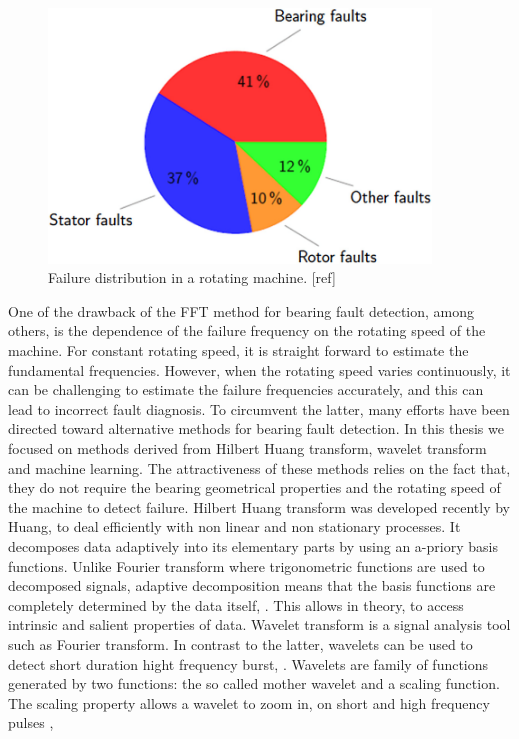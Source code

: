 \documentclass[../Main/thesis.tex]{subfiles}
\begin{document}
\begin{figure}[H] %
   \centering
   \includegraphics[width=4in]{../fig/pie.png} 
   \caption{Failure distribution in a rotating machine. [ref]}
   \label{fig:pie}
\end{figure}
\justify
One of the drawback of the FFT method for bearing fault detection, among others, is the dependence of the failure frequency on the rotating speed of the machine. For constant rotating speed, it is straight forward to estimate the fundamental frequencies. However, when the rotating speed varies continuously, it can be challenging to estimate the failure frequencies accurately, and this can lead to incorrect fault diagnosis.
\justify
To circumvent the latter, many efforts have been directed toward alternative methods for bearing fault detection. In this thesis we focused on methods derived from Hilbert Huang transform, wavelet transform and machine learning. The attractiveness of these methods relies on the fact that, they do not require the bearing geometrical properties and the rotating speed of the machine to detect failure. 
\justify
Hilbert Huang transform was developed recently by  Huang, \cite{huang98} to deal efficiently with non linear and non stationary processes. It decomposes data adaptively 
into its elementary parts by using an a-priory basis functions. Unlike Fourier transform where trigonometric functions are used to decomposed signals, adaptive decomposition means that 
the basis functions are completely determined by the data itself, \cite{huang08}. This allows in theory, to access intrinsic and salient properties of data.
\justify
Wavelet transform is a signal analysis tool such as Fourier transform. In contrast to the latter, wavelets can be used to detect short duration hight frequency burst, \cite{albert09}.
Wavelets are family of functions generated by two functions: the so called mother wavelet and a scaling function. The scaling property allows a wavelet to zoom in, on short and high frequency pulses \cite{albert09},
\end{document}
